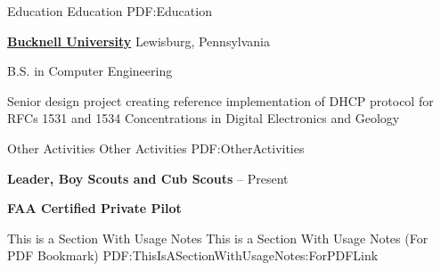 \documentclass[letterpaper,MMMMyyyy,nonstopmode]{simpleresumecv}
\begin{document}
\begin{Body}

\iffalse
\Section
{Publications}
{Publications}
{PDF:Publications}

\SubSection
{Technical Editor}
{Technical Editor}
{PDF:TechnicalEditor}

\Entry
\href{https://www.amazon.com/Oracle-Certified-Associate-ProgrammerStudy/dp/1849687323}
{Reece, Richard M. \textit{Oracle Certified Associate, Java SE 7 Programmer Study Guide}, Packt Publishing, 2012}

\Gap
\Entry
\href
{https://www.amazon.com/Java-Concurrency-Cookbook-FernandezJavier/dp/1849687889}
{Gonzalez, Javier Fernandez. \textit{Java 7 Concurrency Cookbook}, Packt Publishing, 2012}
\fi


\Section
{Education}
{Education}
{PDF:Education}

\Entry
\href{http://www.bucknell.edu/}
{\textbf{Bucknell University}}
\hfill Lewisburg, Pennsylvania

B.S. in Computer Engineering
\iffalse
\hfill
\DatestampYM{1988}{09} --
\DatestampYM{1992}{06}
\fi
\begin{Detail}
\BulletItem
Senior design project creating reference implementation of DHCP protocol for RFCs 1531 and 1534
\BulletItem
Concentrations in Digital Electronics and Geology

\end{Detail}

\Section
{Other Activities}
{Other Activities}
{PDF:OtherActivities}

\Entry
\textbf{Leader, Boy Scouts and Cub Scouts}
\hfill
{} -- Present

\Entry
\textbf{FAA Certified Private Pilot}

\iffalse
\newpage
\begingroup
\color{red}

\Section
{This is a\newline
Section\newline
With\newline
Usage Notes}
{This is a Section With Usage Notes (For PDF Bookmark)}
{PDF:ThisIsASectionWithUsageNotes:ForPDFLink}


\end{Body}
\end{document}
